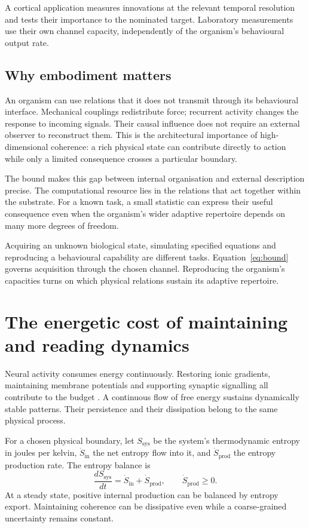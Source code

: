 \documentclass[11pt,a4paper]{article}
\begin{document}
A cortical application measures innovations at the relevant temporal resolution and tests their importance to the nominated target. Laboratory measurements use their own channel capacity, independently of the organism's behavioural output rate.

\subsection{Why embodiment matters}

An organism can use relations that it does not transmit through its behavioural interface. Mechanical couplings redistribute force; recurrent activity changes the response to incoming signals. Their causal influence does not require an external observer to reconstruct them. This is the architectural importance of high-dimensional coherence: a rich physical state can contribute directly to action while only a limited consequence crosses a particular boundary.

The bound makes this gap between internal organisation and external description precise. The computational resource lies in the relations that act together within the substrate. For a known task, a small statistic can express their useful consequence even when the organism's wider adaptive repertoire depends on many more degrees of freedom.

Acquiring an unknown biological state, simulating specified equations and reproducing a behavioural capability are different tasks. Equation~\eqref{eq:bound} governs acquisition through the chosen channel. Reproducing the organism's capacities turns on which physical relations sustain its adaptive repertoire.

\section{The energetic cost of maintaining and reading dynamics}
\label{sec:energy}

Neural activity consumes energy continuously. Restoring ionic gradients, maintaining membrane potentials and supporting synaptic signalling all contribute to the budget \citep{attwell2001,laughlin1998}. A continuous flow of free energy sustains dynamically stable patterns. Their persistence and their dissipation belong to the same physical process.

For a chosen physical boundary, let \(S_{\mathrm{sys}}\) be the system's thermodynamic entropy in joules per kelvin, \(\dot S_{\mathrm{in}}\) the net entropy flow into it, and \(\dot S_{\mathrm{prod}}\) the entropy production rate. The entropy balance is
\begin{equation}
 \frac{dS_{\mathrm{sys}}}{dt}
 =\dot S_{\mathrm{in}}+\dot S_{\mathrm{prod}},
 \qquad \dot S_{\mathrm{prod}}\geq0.
 \label{eq:entropy}
\end{equation}
At a steady state, positive internal production can be balanced by entropy export. Maintaining coherence can be dissipative even while a coarse-grained uncertainty remains constant.
\end{document}
